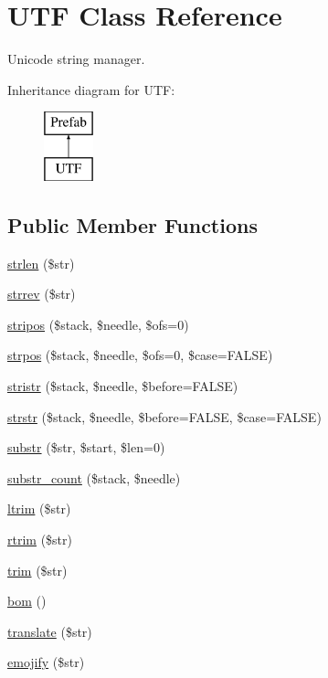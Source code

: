 \hypertarget{class_u_t_f}{}\section{U\+TF Class Reference}
\label{class_u_t_f}


Unicode string manager.  


Inheritance diagram for U\+TF\+:\begin{figure}[H]
\begin{center}
\leavevmode
\includegraphics[height=2.000000cm]{class_u_t_f}
\end{center}
\end{figure}
\subsection*{Public Member Functions}
\begin{DoxyCompactItemize}
\item 
\hyperlink{class_u_t_f_a6379e4105bda35d62738418b43d6c214}{strlen} (\$str)
\item 
\hyperlink{class_u_t_f_aee5290955ede3ffc95e03032792d6cef}{strrev} (\$str)
\item 
\hyperlink{class_u_t_f_a091781748220e04bdfb81119c2d215ab}{stripos} (\$stack, \$needle, \$ofs=0)
\item 
\hyperlink{class_u_t_f_a3ac4e2d27df237cef0d1d7f5b5858841}{strpos} (\$stack, \$needle, \$ofs=0, \$case=F\+A\+L\+SE)
\item 
\hyperlink{class_u_t_f_ae5a935ae0460ac0723be7eb4c677ae4f}{stristr} (\$stack, \$needle, \$before=F\+A\+L\+SE)
\item 
\hyperlink{class_u_t_f_aede414417475770b5dea3c6975c2e3dd}{strstr} (\$stack, \$needle, \$before=F\+A\+L\+SE, \$case=F\+A\+L\+SE)
\item 
\hyperlink{class_u_t_f_ab012fe0920f5e9be4a09e01bfb81b867}{substr} (\$str, \$start, \$len=0)
\item 
\hyperlink{class_u_t_f_a1ed9fae3a0627f5fc1adbafed4adab86}{substr\+\_\+count} (\$stack, \$needle)
\item 
\hyperlink{class_u_t_f_a36a0151237d3480734de64933f769843}{ltrim} (\$str)
\item 
\hyperlink{class_u_t_f_afa81b944f8aed770a266a9884e3e5049}{rtrim} (\$str)
\item 
\hyperlink{class_u_t_f_a432e7b973a6e6bfa55cced21e75ee29e}{trim} (\$str)
\item 
\hyperlink{class_u_t_f_a5cb12f35229a81f7a869171b000573b8}{bom} ()
\item 
\hyperlink{class_u_t_f_a798f9e9997b8a6f34ff111df63531c08}{translate} (\$str)
\item 
\hyperlink{class_u_t_f_aaf95120818560ee5ba86d5f4efba6671}{emojify} (\$str)
\end{DoxyCompactItemize}
